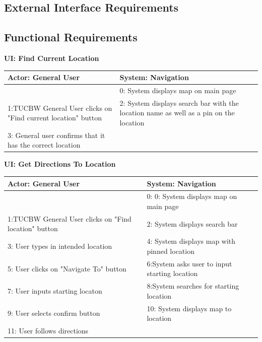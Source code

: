 \documentclass{article}
\begin{document}
    	\subsection{External Interface Requirements}
    	\subsection{Functional Requirements}
	{
	\begin{center}
\textbf{UI: Find Current Location}
\begin{tabular}{ |p{7cm}|p{7cm}| } 
 \hline
 Actor: General User & System: Navigation\\ 
\hline \hline
 & 0: System displays map on main page\\ 
\hline
 1:TUCBW General User clicks on "Find current location" button & 2: System displays search bar with the location name as well as a pin on the location \\ 
\hline
3: General user confirms that it has the correct location & \\
 \hline
\end{tabular}
\end{center}


\begin{center}
\textbf{UI: Get Directions To Location}
\begin{tabular}{  |p{7cm}|p{7cm}| } 
 \hline
 Actor: General User & System: Navigation\\ 
\hline \hline
 & 0: 0: System displays map on main page\\ 
\hline
 1:TUCBW General User clicks on "Find location" button & 2: System displays search bar \\ 
\hline
3: User types in intended location & 4: System displays map with pinned location \\
 \hline
5: User clicks on "Navigate To" button & 6:System asks user to input starting location \\
 \hline
7: User inputs starting locaton & 8:System searches for starting location \\
 \hline
9: User selects confirm button & 10: System displays map to location \\
 \hline
11: User follows directions &  \\
 \hline
\end{tabular}
\end{center}
	
}
\end{document}
